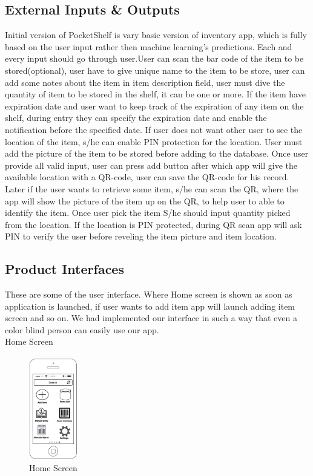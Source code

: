 \subsection{External Inputs \& Outputs}
 Initial version of PocketShelf is vary basic version of inventory app, which is fully based on the user input rather then machine learning's predictions. Each and every input should go through user.User can scan the bar code of the item to be stored(optional), user have to give unique name to the item to be store, user can add some notes about the item in item description field, user must dive the quantity of item to be stored in the shelf, it can be one or more. If the item have expiration date and user want to keep track of the expiration of any item on the shelf, during entry they can specify the expiration date and enable the notification before the specified date. If user does not want other user to see the location of the item, s/he can enable PIN protection for the location. User must add the picture of the item to be stored before adding to the database. Once user provide all valid input, user can press add button after which app will give the available location with a QR-code, user can save the QR-code for his record. Later if the user wants to retrieve some item, s/he can scan the QR, where the app will show the picture of the item up on the QR, to help user to able to identify the item. Once user pick the item S/he should input quantity picked from the location. If the location is PIN protected, during QR scan app will ask PIN to verify the user before reveling the item picture and item location. 
\pagebreak

\subsection{Product Interfaces}
These are some of the user interface. Where Home screen is shown as soon as application is launched, if user wants to add item app will launch adding item screen and so on. We had implemented our interface in such a way that even a color blind person can easily use our app.
\\Home Screen
\begin{figure}[hbt!]
                	\centering
                   	\includegraphics[width=0.19\textwidth]{images/home}
                    \caption{Home Screen}
                \end{figure}

